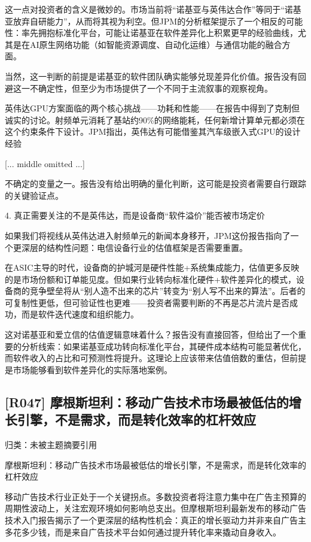 \documentclass[11pt]{ctexart}
\begin{document}
这一点对投资者的含义是微妙的。市场当前将“诺基亚与英伟达合作”等同于“诺基亚放弃自研能力”，从而将其视为利空。但JPM的分析框架提示了一个相反的可能性：率先拥抱标准化平台，可能让诺基亚在软件差异化上积累更早的经验曲线，尤其是在AI原生网络功能（如智能资源调度、自动化运维）与通信功能的融合方面。

当然，这一判断的前提是诺基亚的软件团队确实能够兑现差异化价值。报告没有回避这一不确定性，但至少为市场提供了一个不同于主流叙事的观察视角。

英伟达GPU方案面临的两个核心挑战——功耗和性能——在报告中得到了克制但诚实的讨论。射频单元消耗了基站约90\%的网络能耗，任何新增计算单元都必须在这个约束条件下设计。JPM指出，英伟达有可能借鉴其汽车级嵌入式GPU的设计经验

[... middle omitted ...]

不确定的变量之一。报告没有给出明确的量化判断，这可能是投资者需要自行跟踪的关键验证点。

4. 真正需要关注的不是英伟达，而是设备商“软件溢价”能否被市场定价

如果我们将视线从英伟达进入射频单元的新闻本身移开，JPM这份报告指向了一个更深层的结构性问题：电信设备行业的估值框架是否需要重置。

在ASIC主导的时代，设备商的护城河是硬件性能+系统集成能力，估值更多反映的是市场份额和订单能见度。但如果行业转向标准化硬件+软件差异化的模式，设备商的竞争壁垒将从“别人造不出来的芯片”转变为“别人写不出来的算法”。后者的可复制性更低，但可验证性也更难——投资者需要判断的不再是芯片流片是否成功，而是软件迭代速度和组织能力。

这对诺基亚和爱立信的估值逻辑意味着什么？报告没有直接回答，但给出了一个重要的分析线索：如果诺基亚成功转向标准化平台，其硬件成本结构可能显著优化，而软件收入的占比和可预测性将提升。这理论上应该带来估值倍数的重估，但前提是市场能够看到软件差异化的实际落地案例。

\subsection{[R047] 摩根斯坦利：移动广告技术市场最被低估的增长引擎，不是需求，而是转化效率的杠杆效应}
{\small\color{refgray}归类：未被主题摘要引用}

摩根斯坦利：移动广告技术市场最被低估的增长引擎，不是需求，而是转化效率的杠杆效应

移动广告技术行业正处于一个关键拐点。多数投资者将注意力集中在广告主预算的周期性波动上，关注宏观环境如何影响总支出。但摩根斯坦利最新发布的移动广告技术入门报告揭示了一个更深层的结构性机会：真正的增长驱动力并非来自广告主多花多少钱，而是来自广告技术平台如何通过提升转化率来撬动自身收入。
\end{document}
